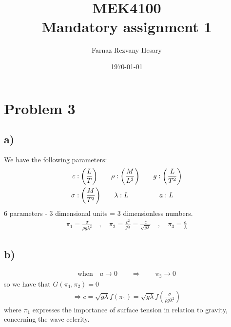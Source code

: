 \documentclass[english,a4paper,12pt]{article}
\title{MEK4100\\ Mandatory assignment 1}
\author{Farnaz Rezvany Hesary}
\date{\today}
\begin{document}
 
 
\lstset{style=mystyle}

\maketitle

\section*{Problem 3}
\subsection*{a)}
We have the following parameters:\\
\begin{align*}
c&:\bigg(\frac{L}{T}\bigg) \qquad \rho:\bigg(\frac{M}{L^3}\bigg) \qquad g:\bigg(\frac{L}{T^2}\bigg)\\
\sigma&:\bigg(\frac{M}{T^2}\bigg) \hspace{7mm} \lambda:L \hspace{16mm} a:L
\end{align*}
6 parameters - 3 dimensional units = 3 dimensionless numbers.\\

\begin{align*}
\pi_1 = \frac{\sigma}{\rho g \lambda^2} \quad, \quad
\pi_2 =\frac{c^2}{g \lambda} = \frac{c}{\sqrt{g\lambda}} \quad, \quad
\pi_3 = \frac{a}{\lambda}
\end{align*}

\subsection*{b)}
\begin{align*}
\text{when}\quad a \rightarrow 0 \qquad \Rightarrow \qquad \pi_3 \rightarrow 0
\end{align*}
so we have that $G(\pi_1,\pi_2)=0$\\ 
\begin{align*}
\Rightarrow c=\sqrt{g \lambda}f(\pi_1) = \sqrt{g \lambda}f(\frac{\sigma}{\rho g \lambda^2})
\end{align*}
where $\pi_1$ expresses the importance of surface tension in relation to gravity, concerning the wave celerity.
\end{document}
